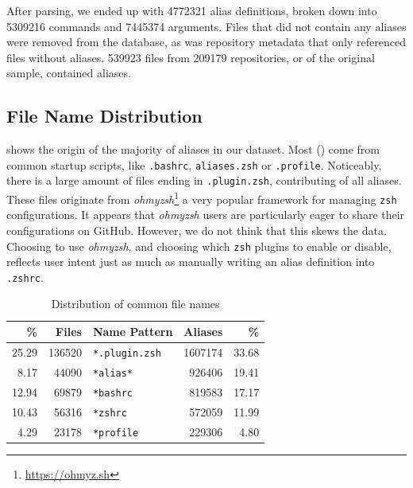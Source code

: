 After parsing, we ended up with \num{4772321} alias definitions, broken down into \num{5309216} commands and \num{7445374} arguments.
Files that did not contain any aliases were removed from the database, as was repository metadata that only referenced files without aliases.
\num{539923} files from \num{209179} repositories, or  of the original sample, contained aliases.

\subsection{File Name Distribution}

 shows the origin of the majority of aliases in our dataset.
Most () come from common startup scripts, like \texttt{.bashrc}, \texttt{aliases.zsh} or \texttt{.profile}.
Noticeably, there is a large amount of files ending in \texttt{.plugin.zsh}, contributing  of all aliases.
These files originate from \emph{ohmyzsh}\footnote{\url{https://ohmyz.sh}} a very popular framework for managing \texttt{zsh} configurations.
It appears that \emph{ohmyzsh} users are particularly eager to share their configurations on GitHub.
However, we do not think that this skews the data.
Choosing to use \emph{ohmyzsh}, and choosing which \texttt{zsh} plugins to enable or disable, reflects user intent just as much as manually writing an alias definition into \texttt{.zshrc}.

\begin{table}[h]
	\caption{Distribution of common file names}
	\label{tab:file-names}
	\begin{tabular}{rrlrr}
		\toprule
		\% &          Files &        Name Pattern &         Aliases &           \% \\
		\midrule
		\num{25.29} &  \num{136520}  & \verb|*.plugin.zsh| &  \num{1607174}  &  \num{33.68} \\
		\num{8.17} &   \num{44090}  &      \verb|*alias*| &   \num{926406}  &  \num{19.41} \\
		\num{12.94} &   \num{69879}  &      \verb|*bashrc| &   \num{819583}  &  \num{17.17} \\
		\num{10.43} &   \num{56316}  &       \verb|*zshrc| &   \num{572059}  &  \num{11.99} \\
		\num{4.29} &   \num{23178}  &     \verb|*profile| &   \num{229306}  &   \num{4.80} \\
		\bottomrule
	\end{tabular}
\end{table}


